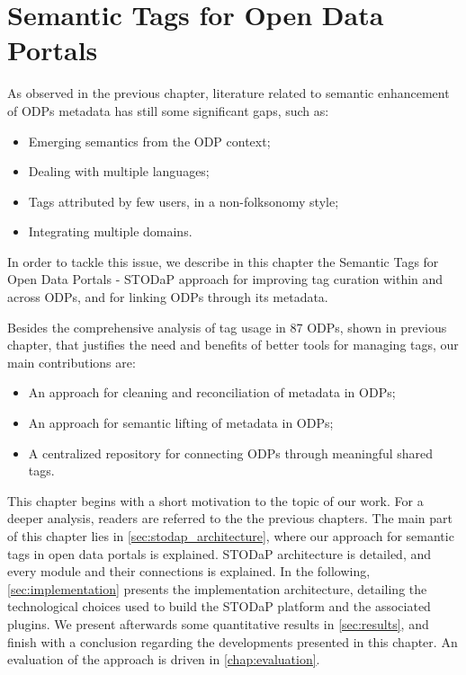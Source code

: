 \chapter{Semantic Tags for Open Data Portals}
\label{chap:tagging}


As observed in the previous chapter, literature related to semantic enhancement of ODPs metadata has still some significant gaps, such as:
\begin{itemize}
	\item Emerging semantics from the ODP context;
	\item Dealing with multiple languages;
	\item Tags attributed by few users, in a non-folksonomy style;
	\item Integrating multiple domains.
\end{itemize}

In order to	tackle this issue, we describe in this chapter the Semantic Tags for Open Data Portals - STODaP approach for improving tag curation within and across ODPs, and for linking ODPs through its metadata.

Besides the comprehensive analysis of tag usage in 87 ODPs, shown in previous chapter, that justifies the need and benefits of better tools for managing tags, our main contributions are:
\begin{itemize}
	\item An approach for cleaning and reconciliation of metadata in ODPs;
	\item An approach for semantic lifting of metadata in ODPs;
	\item A centralized repository for connecting ODPs through meaningful shared tags.
\end{itemize}

This chapter begins with a short motivation to the topic of our work.
For a deeper analysis, readers are referred to the the previous chapters.
The main part of this chapter lies in \autoref{sec:stodap_architecture}, where our approach for semantic tags in open data portals is explained.
STODaP architecture is detailed, and every module and their connections is explained.
In the following, \autoref{sec:implementation} presents the implementation architecture, detailing the technological choices used to build the STODaP platform and the associated plugins.
We present afterwards some quantitative results in \autoref{sec:results}, and finish with a conclusion regarding the developments presented in this chapter.
An evaluation of the approach is driven in \autoref{chap:evaluation}.

